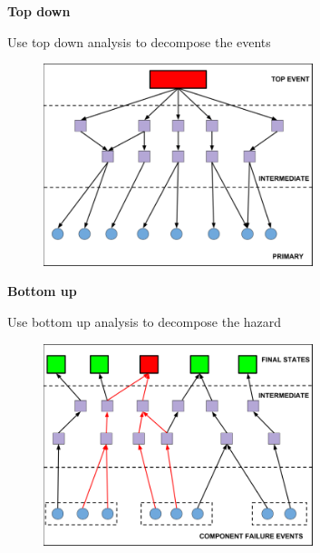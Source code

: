 \documentclass[aspectratio=1610,pdftex,dvipsnames,compress,xcolor={dvipsnames}]{beamer}
\begin{document}
\begin{frame}[plain]{}
    \centering\LARGE\textbf{Top down}
\end{frame}


\addtocounter{framenumber}{-1}
\begin{frame}{Use top down analysis to decompose the events}
    \begin{figure}
        \centering
        \includegraphics[width=0.70\textwidth]{top.down.jpg}
    \end{figure}
\end{frame}


\begin{frame}[plain]{}
    \centering\LARGE\textbf{Bottom up}
\end{frame}


\addtocounter{framenumber}{-1}
\begin{frame}{Use bottom up analysis to decompose the hazard}
    \begin{figure}
        \centering
        \includegraphics[width=0.70\textwidth]{bottom.up.jpg}
    \end{figure}
\end{frame}
\end{document}
